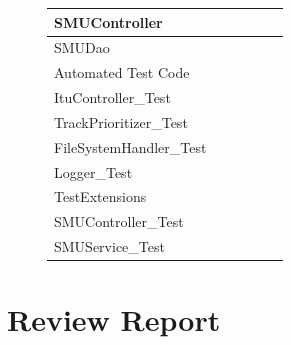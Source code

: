 \documentclass[a4paper,11pt,report]{article}
\begin{document}
\begin{figure}[htp]
\begin{tabular}{| l | l | l | l | l | l |}
  \hline
  SMUController & \cellcolor{Gray} & \cellcolor{Gray} & \cellcolor{Gray} & \cellcolor{Gray} & \cellcolor{Gray} \\
  \hline
  SMUDao & \cellcolor{Gray} & \cellcolor{Gray} & \cellcolor{Gray} & \cellcolor{Gray} & \cellcolor{Gray} \\
  \hline
  \multicolumn{6}{|l|}{Automated Test Code} \\
  \hline
  ItuController\_Test &  & \cellcolor{Gray} &  & \cellcolor{Gray}  & \\
  \hline
  TrackPrioritizer\_Test & \cellcolor{Gray}  &  &  &  &  \\
  \hline
  FileSystemHandler\_Test &  &  &  & \cellcolor{Gray}  &  \\
  \hline
  Logger\_Test &  &  &  & \cellcolor{Gray}  &  \\
  \hline
  TestExtensions &  & \cellcolor{Gray}  &  & \cellcolor{Gray}  &  \\
  \hline
  SMUController\_Test &  & \cellcolor{Gray}  & \cellcolor{Gray}  &  & \cellcolor{Gray}  \\
  \hline
  SMUService\_Test & \cellcolor{Gray}  &  &  & \cellcolor{Gray}  &  \\
  \hline
\end{tabular}
\end{figure}
\newpage
\section{Review Report}
\end{document}
